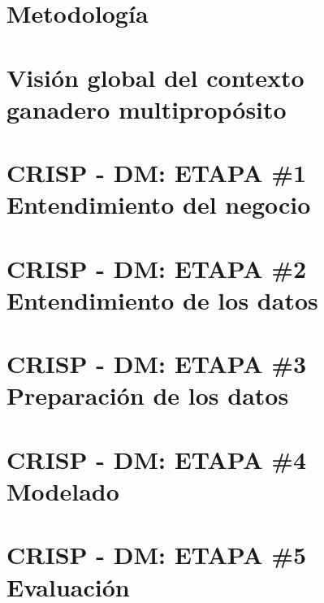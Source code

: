 \documentclass[11pt,twoside]{docs/thesis}
\begin{document}
\chapter{Metodología}


\chapter{Visión global del contexto \\ ganadero multipropósito} \label{visglob}


\chapter{CRISP - DM: ETAPA \#1 \\ Entendimiento del negocio}
\label{crisp1}


\chapter{CRISP - DM: ETAPA \#2 \\ Entendimiento de los datos}
\label{crisp2}


\chapter{CRISP - DM: ETAPA \#3 \\ Preparación de los datos} 
\label{crisp3}


% 

\chapter{CRISP - DM: ETAPA \#4 \\ Modelado}\label{crisp4}
\label{crisp4}


\chapter{CRISP - DM: ETAPA \#5 \\ Evaluación}
\label{crisp5}


% 
\end{document}
